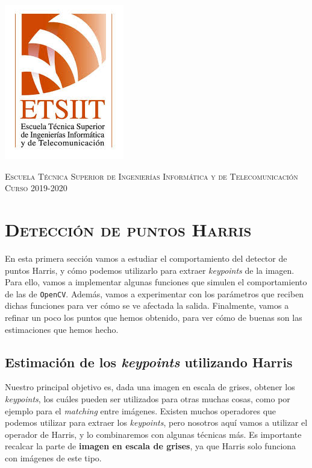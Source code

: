 \documentclass[11pt,a4paper]{article}
\begin{document}
\begin{titlepage}
\begin{minipage}{\textwidth}
\includegraphics[scale=0.3]{img/etsiit.jpeg}

\vspace{0.7cm}
\textsc{Escuela Técnica Superior de Ingenierías Informática y de Telecomunicación}\\
\vspace{1cm}
\textsc{Curso 2019-2020}
\end{minipage}
\end{titlepage}

\tableofcontents
\thispagestyle{empty}				%

\newpage

\setlength{\parskip}{1em}

\section{\textsc{Detección de puntos Harris}}

En esta primera sección vamos a estudiar el comportamiento del detector de
puntos Harris, y cómo podemos utilizarlo para extraer \textit{keypoints} de la
imagen. Para ello, vamos a implementar algunas funciones que simulen
el comportamiento de las de \texttt{OpenCV}. Además, vamos a experimentar
con los parámetros que reciben dichas funciones para ver cómo se ve afectada
la salida. Finalmente, vamos a refinar un poco los puntos que hemos obtenido,
para ver cómo de buenas son las estimaciones que hemos hecho.

\subsection{Estimación de los \textit{keypoints} utilizando Harris}

Nuestro principal objetivo es, dada una imagen en escala de grises,
obtener los \textit{keypoints}, los cuáles pueden ser utilizados para
otras muchas cosas, como por ejemplo para el \textit{matching} entre
imágenes. Existen muchos operadores que podemos utilizar para extraer
los \textit{keypoints}, pero nosotros aquí vamos a utilizar el operador
de Harris, y lo combinaremos con algunas técnicas más. Es importante
recalcar la parte de \textbf{imagen en escala de grises}, ya que Harris
solo funciona con imágenes de este tipo.
\end{document}
